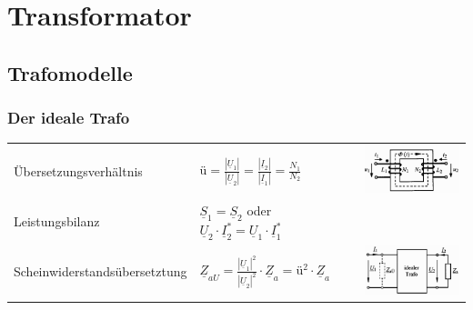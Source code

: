 \section{Transformator}
		
	\subsection{Trafomodelle}
		\subsubsection{Der ideale Trafo}
			\begin{tabular}{p{7cm}p{4.5cm}p{5cm}}
				Übersetzungsverh\"altnis &
					$\text{ü} = \frac{|\underline{U}_1|}{|\underline{U}_2|} =
					\frac{|\underline{I}_2|}{|\underline{I}_1|} = \frac{N_1}{N_2}$ &
					\begin{minipage}{4.5cm}
						\includegraphics[width=3.5cm]{bilder/GrundstruckturTrafo.png}
					\end{minipage} \\
				Leistungsbilanz &
					$\underline{S}_1 = \underline{S}_2$ 
					oder $\underline{U}_2 \cdot \underline{I}_2^* = \underline{U}_1 \cdot \underline{I}_1^*$ \\
				Scheinwiderstandsübersetztung &
					$\underline{Z}_{aU} = \frac{|\underline{U}_1|^2}{|\underline{U}_2|^2} \cdot \underline{Z}_a = \text{ü}^2 \cdot \underline{Z}_a$ &
					\begin{minipage}{4.5cm}
	            		\includegraphics[width=3.5cm]{bilder/IdealerTravoImpedanzwandler.png}
	            	\end{minipage}
			\end{tabular}

